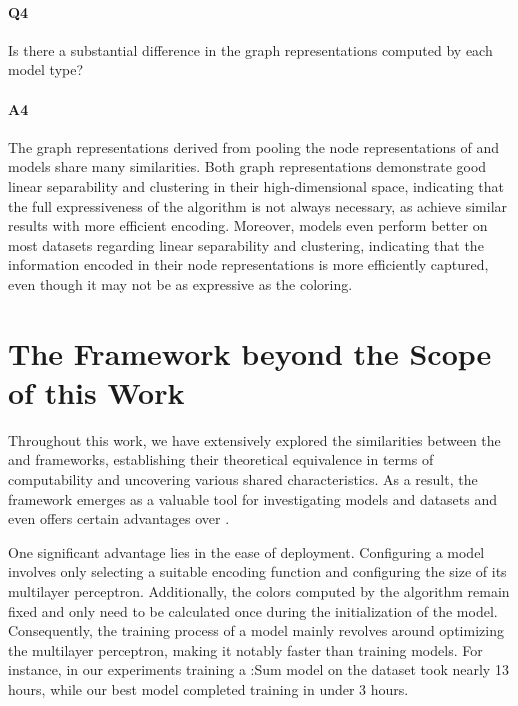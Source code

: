 \paragraph{Q4} Is there a substantial difference in the graph representations computed by each model type?

\vspace{-15pt}

\paragraph{A4} The graph representations derived from pooling the node representations of \wlnn and \gnn models share many similarities. Both graph representations demonstrate good linear separability and clustering in their high-dimensional space, indicating that the full expressiveness of the \wl algorithm is not always necessary, as \gnns achieve similar results with more efficient encoding. Moreover, \gnn models even perform better on most datasets regarding linear separability and clustering, indicating that the information encoded in their node representations is more efficiently captured, even though it may not be as expressive as the \wl coloring.

\section{The \wlnn Framework beyond the Scope of this Work}
Throughout this work, we have extensively explored the similarities between the \wlnn and \gnn frameworks, establishing their theoretical equivalence in terms of computability and uncovering various shared characteristics. As a result, the \wlnn framework emerges as a valuable tool for investigating \gnn models and datasets and even offers certain advantages over \gnns.

One significant advantage lies in the ease of deployment. Configuring a \wlnn model involves only selecting a suitable encoding function and configuring the size of its multilayer perceptron. Additionally, the colors computed by the \wl algorithm remain fixed and only need to be calculated once during the initialization of the model. Consequently, the training process of a \wlnn model mainly revolves around optimizing the multilayer perceptron, making it notably faster than training \gnn models. For instance, in our experiments training a \gin:\textsf{Sum} model on the \zinc dataset took nearly 13 hours, while our best \wlnn model completed training in under 3 hours.

